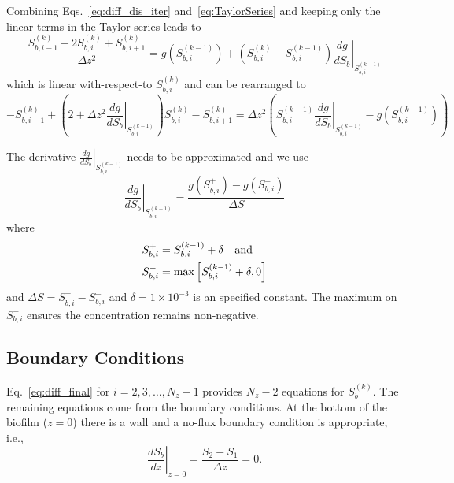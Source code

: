 \documentclass[letterpaper, twoside]{article}
\newcommand{\ie}{i.e.}
\begin{document}
Combining Eqs.~\ref{eq:diff_dis_iter} and~\ref{eq:TaylorSeries} and keeping only the linear terms in the Taylor series leads to
\begin{equation} \label{eq:diff_linear}
  \frac{ S_{b,i-1}^{(k)} - 2 S_{b,i}^{(k)} + S_{b,i+1}^{(k)}}{\Delta z^2} =  g\left(S_{b,i}^{(k-1)}\right) + \left( S_{b,i}^{(k)} - S_{b,i}^{(k-1)}\right) \left.\frac{d g}{d S_b}\right|_{S_{b,i}^{(k-1)}} 
\end{equation}
which is linear with-respect-to $S_{b,i}^{(k)}$ and can be rearranged to
\begin{equation}
  \label{eq:diff_final}
  -S_{b,i-1}^{(k)} + \left( 2 +\Delta z^2\left.\frac{d g}{d S_b}\right|_{S_{b,i}^{(k-1)}}\right) S_{b,i}^{(k)} - S_{b,i+1}^{(k)}
  = \Delta z^2\left( S_{b,i}^{(k-1)} \left.\frac{d g}{d S_b}\right|_{S_{b,i}^{(k-1)}} - g\left(S_{b,i}^{(k-1)}\right)\right) 
\end{equation}

The derivative $\left.\frac{d g}{d S_b}\right|_{S_{b,i}^{(k-1)}}$ needs to be approximated and we use
\begin{equation}
  \label{eq:dgds}
  \left.\frac{d g}{d S_b}\right|_{S_{b,i}^{(k-1)}} = \frac{g\left(S_{b,i}^+\right) - g\left(S_{b,i}^{-}\right)}{\Delta S}
\end{equation}
where
\begin{align*}
  S_{b,i}^+&=S_{b,i}^{(k-1)}+\delta \text{\quad and} \\
  S_{b,i}^-&=\max\left[S_{b,i}^{(k-1)}+\delta,0\right]
\end{align*}
and $\Delta S = S_{b,i}^+ - S_{b,i}^-$ and $\delta=1\times 10^{-3}$ is an specified constant.  The maximum on $S_{b,i}^-$ ensures the concentration remains non-negative.

\subsection{Boundary Conditions}
Eq.~\ref{eq:diff_final} for $i=2,3,\dots,N_z-1$ provides $N_z-2$ equations for $S_{b}^{(k)}$.  The remaining equations come from the boundary conditions.  At the bottom of the biofilm ($z=0$) there is a wall and a no-flux boundary condition is appropriate, \ie,
\begin{equation}
  \label{eq:BC1}
  \left.\frac{d S_b}{dz}\right|_{z=0}= \frac{S_2 - S_1}{\Delta z} =0.
\end{equation}
\end{document}
